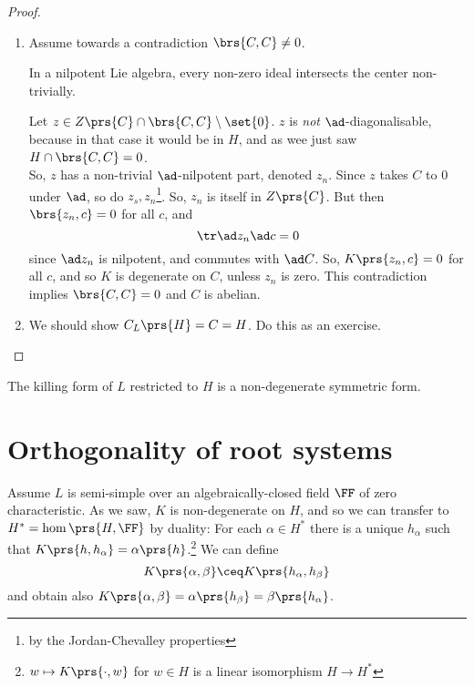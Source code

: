 \documentclass[10pt,a4paper,twoside,openany,hidelinks]{book}
\begin{document}
\begin{proof}
\begin{enumerate}[label = Step \arabic*.]
\item Assume towards a contradiction $\brs{C,C} \neq 0$.

\begin{exercise}
In a nilpotent Lie algebra, every non-zero ideal intersects the center non-trivially.
\end{exercise}

Let $z \in Z\prs {C} \cap \brs{C,C} \setminus \set{0}$.
$z$ is \emph{not} $\ad$-diagonalisable, because in that case it would be in $H$, and as wee just saw $H\cap \brs{C,C} = 0$. \\
So, $z$ has a non-trivial $\ad$-nilpotent part, denoted
$z_n$. Since $z$ takes $C$ to $0$ under $\ad$, so do $z_s,z_n$\footnote{by the Jordan-Chevalley properties}.
So, $z_n$ is itself in $Z\prs{C}$. But then $\brs{z_n, c} = 0$ for all $c$, and \[\tr \ad z_n \ad c = 0\] since $\ad z_n$ is nilpotent, and commutes with  $\ad C$. So, $K\prs{z_n, c} = 0$ for all $c$, and so $K$ is degenerate on $C$, unless $z_n$ is zero. This contradiction implies $\brs{C,C} = 0$ and $C$ is abelian.

\item We should show $C_L\prs{H} = C = H$. Do this as an exercise.

\end{enumerate}
\end{proof}

\begin{corollary}
The killing form of $L$ restricted to $H$ is a non-degenerate symmetric form.
\end{corollary}

\section{Orthogonality of root systems}

Assume $L$ is semi-simple over an algebraically-closed field $\FF$ of zero characteristic.
As we saw, $K$ is non-degenerate on $H$, and so we can transfer to $H^* = \hom\prs{H,\FF}$ by duality:
For each $\alpha \in H^*$ there is a unique $h_{\alpha}$ such that $K\prs{h, h_{\alpha}} = \alpha\prs{h}$.\footnote{$w \mapsto K\prs{\cdot, w}$ for $w \in H$ is a linear isomorphism $H \to H^*$}
We can define \[K\prs{\alpha,\beta} \ceq K\prs{h_{\alpha}, h_{\beta}}\]
and obtain also $K\prs{\alpha,\beta} = \alpha\prs{h_{\beta}} = \beta\prs{h_{\alpha}}$.
\end{document}
